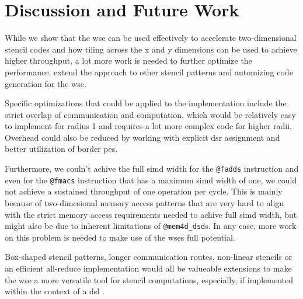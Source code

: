 \chapter{Discussion and Future Work}
While we show that the \ac{wse} can be used effectively to accelerate two-dimensional stencil codes and how tiling across the x and y dimensions can be used to achieve higher throughput, a lot more work is needed to further optimize the performance, extend the approach to other stencil patterns and automizing code generation for the \ac{wse}.

Specific optimizations that could be applied to the implementation include the strict overlap of communication and computation.
which would be relatively easy to implement for radius 1 and requires a lot more complex code for higher radii. Overhead could also be reduced by working with explicit \ac{dsr} assignment and better utilization of border \acp{pe}.

Furthermore, we couln't achive the full \ac{simd} width for the \texttt{@fadds} instruction and even for the \texttt{@fmacs} instruction that has a maximum \ac{simd} width of one, we could not achieve a sustained throughput of one operation per cycle.
This is mainly because of two-dimesional memory access patterns that are very hard to align with the strict memory access requirements needed to achive full \ac{simd} width, but might also be due to inherent limitations of \texttt{@mem4d\_dsd}s.
In any case, more work on this problem is needed to make use of the \ac{wse}s full potential.

Box-shaped stencil patterns, longer communication routes, non-linear stencils or an efficient all-reduce implementation would all be valueable extensions to make the \ac{wse} a more versatile tool for stencil computations, especially, if implemented within the context of a \ac{dsl} \cite{woo2022disruptive,sai2024automated}.


